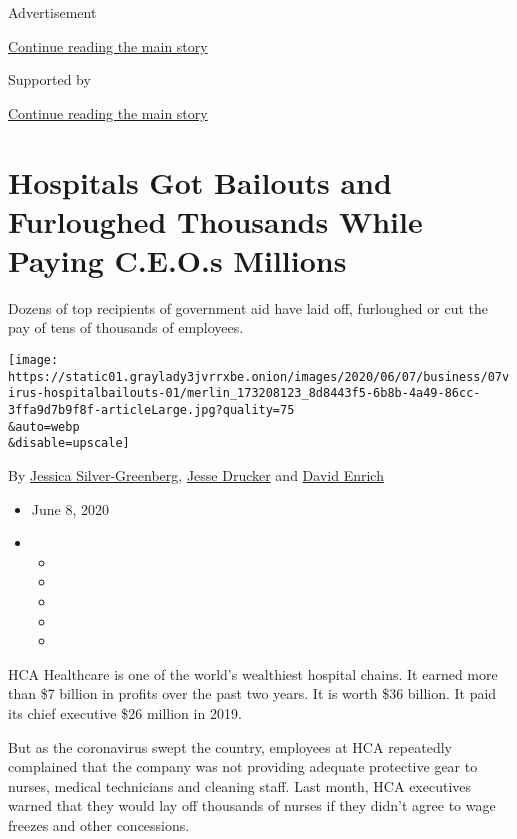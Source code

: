 Advertisement

\protect\hyperlink{after-top}{Continue reading the main story}

Supported by

\protect\hyperlink{after-sponsor}{Continue reading the main story}

\hypertarget{hospitals-got-bailouts-and-furloughed-thousands-while-paying-ceos-millions}{%
\section{Hospitals Got Bailouts and Furloughed Thousands While Paying
C.E.O.s
Millions}\label{hospitals-got-bailouts-and-furloughed-thousands-while-paying-ceos-millions}}

Dozens of top recipients of government aid have laid off, furloughed or
cut the pay of tens of thousands of employees.

\texttt{[image: https://static01.graylady3jvrrxbe.onion/images/2020/06/07/business/07virus-hospitalbailouts-01/merlin\_173208123\_8d8443f5-6b8b-4a49-86cc-3ffa9d7b9f8f-articleLarge.jpg?quality=75\\\&auto=webp\\\&disable=upscale]}

By
\href{https://www.nytimes3xbfgragh.onion/by/jessica-silver-greenberg}{Jessica
Silver-Greenberg},
\href{https://www.nytimes3xbfgragh.onion/by/jesse-drucker}{Jesse
Drucker} and
\href{https://www.nytimes3xbfgragh.onion/by/david-enrich}{David Enrich}

\begin{itemize}
\item
  June 8, 2020
\item
  \begin{itemize}
  \item
  \item
  \item
  \item
  \item
  \end{itemize}
\end{itemize}

HCA Healthcare is one of the world's wealthiest hospital chains. It
earned more than \$7 billion in profits over the past two years. It is
worth \$36 billion. It paid its chief executive \$26 million in 2019.

But as the coronavirus swept the country, employees at HCA repeatedly
complained that the company was not providing adequate protective gear
to nurses, medical technicians and cleaning staff. Last month, HCA
executives warned that they would lay off thousands of nurses if they
didn't agree to wage freezes and other concessions.

